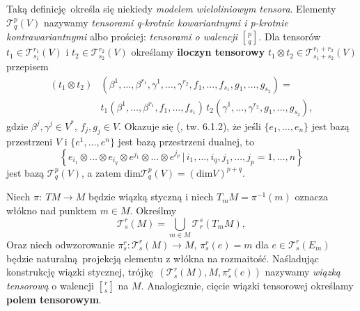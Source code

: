 Taką definicję określa się niekiedy \emph{modelem wieloliniowym tensora}. Elementy \(\mathcal{T}_q^p(V)\) nazywamy \emph{tensorami q-krotnie kowariantnymi i p-krotnie kontrawariantnymi} albo prościej: \emph{tensorami o walencji} \(p \brack q\). Dla tensorów \(t_1 \in \mathcal{T}_{s_1}^{r_1}(V)\) i \(t_2 \in \mathcal{T}_{s_2}^{r_2}(V)\) określamy \textbf{iloczyn tensorowy} \(t_1 \otimes t_2 \in \mathcal{T}_{s_1+s_2}^{r_1+r_2}(V)\) przepisem 
\begin{align*}
    (t_1 \otimes t_2)& (\beta^1,\dots, \beta^{r_1}, \gamma^1, \dots, \gamma^{r_2}, f_1, \dots, f_{s_1}, g_1, \dots, g_{s_2}) = \\
                     & t_1(\beta^1,\dots, \beta^{r_1}, f_1, \dots, f_{s_1})\,t_2(\gamma^1, \dots, \gamma^{r_2},g_1, \dots, g_{s_2}),
\end{align*}
gdzie \(\beta^j, \gamma^j \in V^\ast\), \(f_j, g_j\in V\).
Okazuje się (\cite{marsden}, tw. 6.1.2), że jeśli \(\{e_1, \dots, e_n\}\) jest bazą przestrzeni \(V\) i \(\{e^1, \dots, e^n\}\) jest bazą przestrzeni dualnej, to
\begin{equation*}
    \left\{e_{i_1} \otimes \dots \otimes e_{i_q} \otimes e^{j_1} \otimes \dots \otimes e^{j_p} \, | \, i_1, \dots, i_q, j_1, \dots, j_p = 1, \dots, n \right\} 
\end{equation*}
jest bazą \(\mathcal{T}_q^p(V)\), a zatem \(\mathrm{dim}\mathcal{T}_q^p(V) = (\mathrm{dim}V)^{p+q}\). 

Niech \(\pi:\:TM\to M\) będzie wiązką styczną i niech \(T_m M = \pi^{-1}(m)\) oznacza włókno nad punktem \(m\in M\). Określmy
\begin{equation*}
    \mathcal{T}_s^r(M)=\bigcup\limits_{m\in M} \mathcal{T}_r^s(T_m M),
\end{equation*}
Oraz niech odwzorowanie \(\pi_s^r:\mathcal{T}_s^r(M)\to M\), \(\pi_s^r(e) = m\) dla \(e\in \mathcal{T}_s^r(E_m)\) będzie naturalną projekcją elementu z włókna na rozmaitość. Naśladując konstrukcję wiązki stycznej, trójkę \((\mathcal{T}_s^r(M), M, \pi_s^r(e))\) nazywamy \emph{wiązką tensorową} o walencji \(r \brack s\) na \(M\). Analogicznie, cięcie wiązki tensorowej określamy \textbf{polem tensorowym}. 

